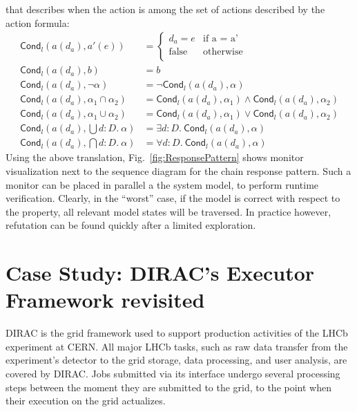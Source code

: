 \documentclass[letter]{llncs}
\newcommand{\TrA}{\ensuremath{\mathsf{Cond}}}
\begin{document}
that describes when the action is among the set of actions described by
the action formula:
\[
\begin{array}{ll}
\TrA_l(a(d_a),a'(e)) & = \left \{ \begin{array}{ll} d_a = e & \text{if a = a'}\\
                                  \text{false} & \text{otherwise}\\
                                  \end{array} \right .\\
\TrA_l(a(d_a),b) & = b \\
\TrA_l(a(d_a),\neg \alpha) & = \neg \TrA_l(a(d_a),\alpha) \\
\TrA_l(a(d_a),\alpha_1 \cap \alpha_2) & =
\TrA_l(a(d_a),\alpha_1) \wedge \TrA_l(a(d_a),\alpha_2) \\
\TrA_l(a(d_a),\alpha_1 \cup \alpha_2) & =
\TrA_l(a(d_a),\alpha_1) \vee \TrA_l(a(d_a),\alpha_2) \\
\TrA_l(a(d_a),\bigcup d{:}D.~\alpha) & = \exists d{:}D.~ \TrA_l(a(d_a),\alpha)\\
\TrA_l(a(d_a),\bigcap d{:}D.~\alpha) & = \forall d{:}D.~ \TrA_l(a(d_a),\alpha)
\end{array}
\]
Using the above translation, Fig.~\ref{fig:ResponsePattern} shows monitor visualization next to the sequence diagram for the chain response pattern.
Such a monitor can be placed in parallel a the system model,
to perform runtime verification. Clearly, in the ``worst'' case, if the model is correct with respect to the property,
all relevant model states will be traversed. In practice however, refutation can be found 
quickly after a limited exploration. 
\section{Case Study: DIRAC's Executor Framework revisited}
DIRAC \cite{DIRAC_CommGridSolution} is the grid framework used to support production activities of the LHCb experiment at CERN.
All major LHCb tasks, such as raw data transfer from the experiment's detector to the grid storage, data processing, and user analysis,
are covered by DIRAC. 
Jobs submitted via its interface undergo several processing steps between the moment they are submitted to the grid, 
to the point when their execution on the grid actualizes. 
\end{document}
